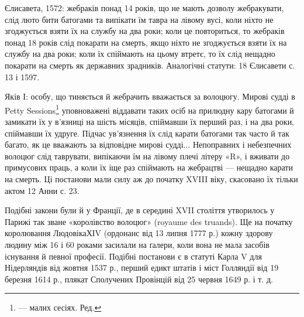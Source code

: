 Єлисавета, 1572: жебраків понад 14 років, що не мають дозволу
жебракувати, слід люто бити батогами та випікати їм тавра
на лівому вусі, коли ніхто не згоджується взяти їх на службу
на два роки; коли це повториться, то жебраків понад 18 років
слід покарати на смерть, якщо ніхто не згоджується взяти їх
на службу на два роки; коли їх спіймають на цьому втретє, то
їх слід нещадно покарати на смерть як державних зрадників.
Аналогічні статути: 18 Єлисавети с. 13 і 1597.

Яків І: особу, що тиняється й жебрачить вважається за волоцюгу.
Мирові судді в Petty Sessions\footnote*{
— малих сесіях. Ред.
} уповноважені віддавати
таких осіб на прилюдну кару батогами й замикати їх у в’язниці
на шість місяців, спіймавши їх перший раз, і на два роки, спіймавши
їх удруге. Підчас ув’язнення їх слід карати батогами так часто
й так багато, як це вважають за відповідне мирові судді... Непоправних
і небезпечних волоцюг слід таврувати, випікаючи
їм на лівому плечі літеру «R», і вживати до примусових праць,
а коли їх іще раз спіймають на жебрацтві — нещадно карати
на смерть. Ці постанови мали силу аж до початку XVIII віку,
скасовано їх тільки актом 12 Анни с. 23.

Подібні закони були й у Франції, де в середині XVII століття
утворилось у Парижі так зване «королівство волоцюг»
(royaume des truands). Ще на початку королювання ЛюдовікаХІV
(ордонанс від 13 липня 1777 р.) кожну здорову людину між 16 і
60 роками засилали на ґалери, коли вона не мала засобів існування
й певної професії. Подібні постанови є в статуті Карла V
для Нідерляндів від жовтня 1537 р., перший едикт штатів і міст
Голляндії від 19 березня 1614 р., плякат Сполучених Провінцій
від 25 червня 1649 р. і т. д.

